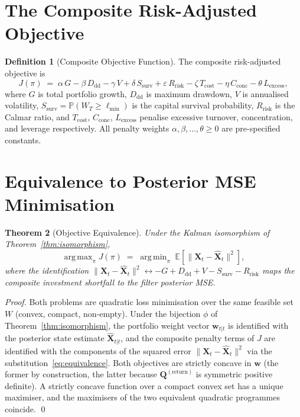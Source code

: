 \documentclass[12pt,openany]{book}
\newcommand{\Prob}{\mathbb{P}}
\newcommand{\bfQ}{\mathbf{Q}}
\DeclareMathOperator*{\argmax}{arg\,max}
\DeclareMathOperator*{\argmin}{arg\,min}
\numberwithin{equation}{chapter}
\theoremstyle{plain}
\newtheorem{theorem}{Theorem}[chapter]
\theoremstyle{definition}
\newtheorem{definition}[theorem]{Definition}
\theoremstyle{remark}
\def\mathcal#1{#1}%
\begin{document}
\section{The Composite Risk-Adjusted Objective}

\begin{definition}[Composite Objective Function]
\label{def:objective}
The composite risk-adjusted objective is
\begin{equation}
  J(\pi) \;=\; \alpha\,G - \beta\,D_{\mathrm{dd}}
  - \gamma\,V + \delta\,S_{\mathrm{surv}} + \varepsilon\,R_{\mathrm{risk}}
  - \zeta\,T_{\mathrm{cost}} - \eta\,C_{\mathrm{conc}}
  - \theta\,L_{\mathrm{excess}},
  \label{eq:objective}
\end{equation}
where $G$ is total portfolio growth, $D_{\mathrm{dd}}$ is maximum
drawdown, $V$ is annualised volatility, $S_{\mathrm{surv}} =
\Prob(W_T \geq \ell_{\min})$ is the capital survival probability,
$R_{\mathrm{risk}}$ is the Calmar ratio, and $T_{\mathrm{cost}}$,
$C_{\mathrm{conc}}$, $L_{\mathrm{excess}}$ penalise excessive
turnover, concentration, and leverage respectively.
All penalty weights $\alpha, \beta, \ldots, \theta \geq 0$ are
pre-specified constants.
\end{definition}

\section{Equivalence to Posterior MSE Minimisation}

\begin{theorem}[Objective Equivalence]
\label{thm:equivalence}
Under the Kalman isomorphism of Theorem~\ref{thm:isomorphism},
\begin{equation}
  \argmax_{\pi} J(\pi)
  \;=\; \argmin_{\pi}
  \;\mathbb{E}\!\left[\bigl\|\mathbf{X}_t
  - \hat{\mathbf{X}}_t\bigr\|^2\right],
  \label{eq:equivalence}
\end{equation}
where the identification $\|\mathbf{X}_t - \hat{\mathbf{X}}_t\|^2
\leftrightarrow -G + D_{\mathrm{dd}} + V - S_{\mathrm{surv}} -
R_{\mathrm{risk}}$ maps the composite investment shortfall to the
filter posterior MSE.
\end{theorem}

\begin{proof}
Both problems are quadratic loss minimisation over the same
feasible set $\mathcal{W}$ (convex, compact, non-empty).  Under
the bijection $\phi$ of Theorem~\ref{thm:isomorphism}, the
portfolio weight vector $\mathbf{w}_{t|t}$ is identified with the
posterior state estimate $\hat{\mathbf{X}}_{t|t}$, and the
composite penalty terms of $J$ are identified with the components
of the squared error $\|\mathbf{X}_t - \hat{\mathbf{X}}_t\|^2$
via the substitution~\eqref{eq:equivalence}.  Both objectives
are strictly concave in $\mathbf{w}$ (the former by construction,
the latter because $\bfQ^{(\mathrm{return})}$ is symmetric
positive definite).  A strictly concave function over a compact
convex set has a unique maximiser, and the maximisers of the
two equivalent quadratic programmes coincide.
\qed
\end{proof}
\end{document}
